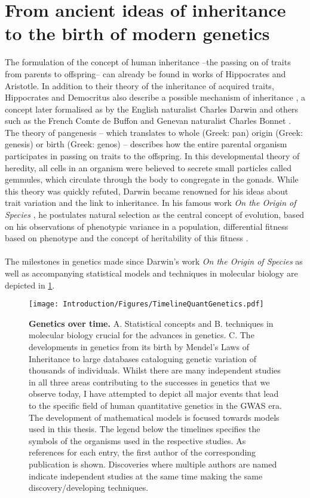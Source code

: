 \section{From ancient ideas of inheritance to the birth of modern genetics}
The formulation of the concept of human inheritance --the passing on of traits from parents to offspring-- can already be found in works of Hippocrates and Aristotle. In addition to their theory of the inheritance of acquired traits, Hippocrates and Democritus also describe a possible mechanism of inheritance \citep{Zirkle1935}, a concept later formalised as  by the English naturalist Charles Darwin \parencite*{Darwin1868} and others such as the French Comte de Buffon \parencite*{Buffon1749} and Genevan naturalist Charles Bonnet \parencite*{Bonnet1779}. The theory of pangenesis -- which translates to whole (Greek: pan) origin (Greek: genesis) or birth (Greek: genos) -- describes how the entire parental organism participates in passing on traits to the offspring. In this developmental theory of heredity, all cells in an organism were believed to secrete small particles called gemmules, which circulate through the body to congregate in the gonads. While this theory was quickly refuted, Darwin became renowned for his ideas about trait variation and the link to inheritance. In his famous work \textit{On the Origin of Species} \parencite*{Darwin1859}, he postulates natural selection as the central concept of evolution, based on his observations of phenotypic variance in a population, differential fitness based on phenotype and the concept of heritability of this fitness \citep{Lewontin1970}. 
\\
\\
The milestones in genetics made since Darwin's work \textit{On the Origin of Species} as well as accompanying statistical models and techniques in molecular biology are depicted in \cref{fig:timeline-genetics}.

\begin{figure}[hbtp]
	\centering
	\texttt{[image: Introduction/Figures/TimelineQuantGenetics.pdf]}
	\caption[\textbf{Genetics over time. }]{\textbf{Genetics over time. } A. Statistical concepts and B. techniques in molecular biology crucial for the advances in genetics. C. The developments in genetics from its birth by Mendel's Laws of Inheritance to large databases cataloguing genetic variation of thousands of individuals. Whilst there are many independent studies in all three areas contributing to the successes in genetics that we observe today, I have attempted to depict all major events that lead to the specific field of human quantitative genetics in the GWAS era. The development of mathematical models is focused towards models used in this thesis. The legend below the timelines specifies the symbols of the organisms used in the respective studies. As references for each entry, the first author of the corresponding publication is shown. Discoveries where multiple authors are named indicate independent studies at the same time making the same discovery/developing techniques. } 
	 	\label{fig:timeline-genetics}
\end{figure}


